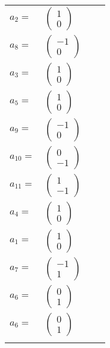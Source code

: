 \documentclass[1p]{elsarticle_modified}
\theoremstyle{definition}
\begin{document}
\begin{tabular}{m{7pt} m{180pt} m{7pt} m{180pt} }
\flushright $a_{2}=$&$\begin{pmatrix}1\\0\end{pmatrix}$ \\
\flushright $a_{8}=$&$\begin{pmatrix}-1\\0\end{pmatrix}$ \\
\flushright $a_{3}=$&$\begin{pmatrix}1\\0\end{pmatrix}$ \\
\flushright $a_{5}=$&$\begin{pmatrix}1\\0\end{pmatrix}$ \\
\flushright $a_{9}=$&$\begin{pmatrix}-1\\0\end{pmatrix}$ \\
\flushright $a_{10}=$&$\begin{pmatrix}0\\-1\end{pmatrix}$ \\
\flushright $a_{11}=$&$\begin{pmatrix}1\\-1\end{pmatrix}$ \\
\flushright $a_{4}=$&$\begin{pmatrix}1\\0\end{pmatrix}$ \\
\flushright $a_{1}=$&$\begin{pmatrix}1\\0\end{pmatrix}$ \\
\flushright $a_{7}=$&$\begin{pmatrix}-1\\1\end{pmatrix}$ \\
\flushright $a_{6}=$&$\begin{pmatrix}0\\1\end{pmatrix}$\\ \flushright $a_{6}=$&$\begin{pmatrix}0\\1\end{pmatrix}$\\&\end{tabular}
\end{document}
